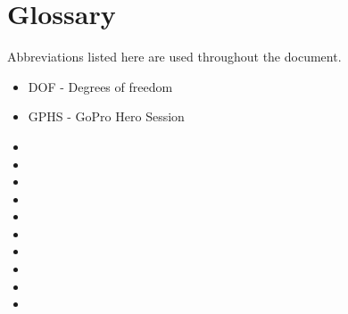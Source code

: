 \chapter*{Glossary}

Abbreviations listed here are used throughout the document.

\begin{itemize}

\item DOF - Degrees of freedom
\item GPHS - GoPro Hero Session
\item 

\item 
\item 
\item 
\item 

\item 
\item 
\item 
\item 

\item 

\end{itemize}